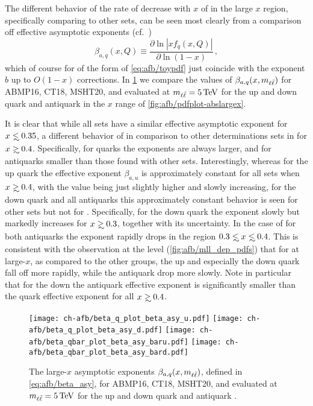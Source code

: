The different behavior of the rate of decrease with $x$ of
\pdfs  in the large $x$ region, specifically comparing 
to other \pdf sets, can  be seen most clearly from a comparison off
effective asymptotic exponents (cf.\ \cite{Ball:2016spl})
\begin{equation}
  \beta_{a,q}(x,Q)\equiv\frac{\partial \ln|xf_q(x,Q)|}{\partial \ln(1-x)}\,,
  \label{eq:afb/beta_asy}
\end{equation}
which of course for \pdfs of the form of \cref{eq:afb/toypdf} just
coincide with the exponent $b$ up to $O(1-x)$ corrections.
In \cref{fig:afb/asy_exponents} we compare
the values of $\beta_{a,q}(x,m_{\ell\bar{\ell}})$
for ABMP16, CT18, MSHT20, and  evaluated at $\mll=\SI{5}{\tera\electronvolt}$
for the up and down quark and antiquark \pdfs in the  $x$ range of
\cref{fig:afb/pdfplot-abslargex}.

It is clear that while all \pdf
sets have a similar effective asymptotic exponent for $x\lsim 0.35$, a
different behavior of  in comparison to other
determinations sets in for $x\gsim 0.4$.
%
Specifically, for quarks the  exponents are always larger,
and for antiquarks smaller than those found with other \pdf
sets.
%
Interestingly, whereas for the up quark the
effective exponent $\beta_{a,u}$ is approximately constant for all
\pdf sets when  $x\gsim 0.4$, with the  value being just
slightly higher and slowly increasing, for the down quark and all
antiquarks this approximately constant behavior is seen for other
\pdf sets but not for .
%
Specifically, for the  down quark
the exponent slowly but markedly increases for $x\gsim 0.3$, together 
with its uncertainty.
%
In the case of  for both antiquarks the exponent
rapidly drops  in the region $0.3 \lsim x \lsim 0.4$.
%
This is consistent with the observation at the \pdf level
(\cref{fig:afb/mll_dep_pdfs})  that for 
at large-$x$, as compared to the other groups,
the up and especially the down  quark fall off more rapidly, while
the antiquark \pdfs drop more slowly. Note in particular that for
the down \pdf the antiquark effective exponent is significantly
smaller than the quark effective exponent for all $x\gsim0.4$.

\begin{figure}[!t]
 \centering
 \texttt{[image: ch-afb/beta\_q\_plot\_beta\_asy\_u.pdf]}
 \texttt{[image: ch-afb/beta\_q\_plot\_beta\_asy\_d.pdf]}
 \texttt{[image: ch-afb/beta\_qbar\_plot\_beta\_asy\_baru.pdf]}
 \texttt{[image: ch-afb/beta\_qbar\_plot\_beta\_asy\_bard.pdf]}
 \caption{\small 
   The large-$x$ asymptotic exponents $\beta_{a,q}(x,m_{\ell\bar{\ell}})$, defined in
   \cref{eq:afb/beta_asy}, for ABMP16, CT18, MSHT20, and  evaluated at
   $\mll=\SI{5}{\tera\electronvolt}$ for the up and down quark and antiquark \pdfs.
 }
 \label{fig:afb/asy_exponents}
\end{figure}

